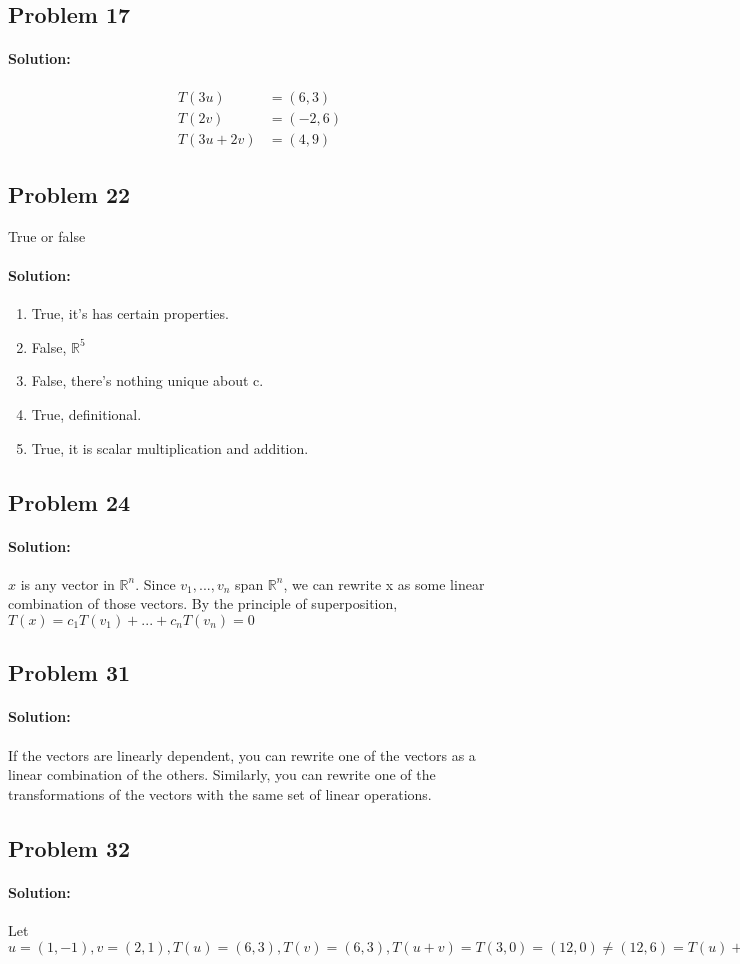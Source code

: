 \documentclass[11pt, notitlepage]{article}
\newcommand{\R}{\mathbb{R}}
\newenvironment{solution}{\paragraph{Solution:}}{\hfill}
\begin{document}
\subsection{Problem 17}
\begin{solution}
	\begin{align*}
		T(3u)&=(6, 3) \\
		T(2v)&=(-2, 6) \\
		T(3u+2v)&=(4,9)
	\end{align*}
\end{solution}
\subsection{Problem 22}
True or false
\begin{solution}
	\begin{enumerate}[label=\alph*.)]
		\item True, it's has certain properties.
		\item False, $\R^5$
		\item False, there's nothing unique about c.
		\item True, definitional.
		\item True, it is scalar multiplication and addition.
	\end{enumerate}
\end{solution}
\subsection{Problem 24}
\begin{solution}
	$x$ is any vector in $\R^n$. Since $v_1,...,v_n$ span $\R^n$, we can rewrite x as some linear combination of those vectors. By the principle of superposition, $T(x)=c_1T(v_1)+...+c_nT(v_n)=0$
\end{solution}
\subsection{Problem 31}
\begin{solution}
	If the vectors are linearly dependent, you can rewrite one of the vectors as a linear combination of the others. Similarly, you can rewrite one of the transformations of the vectors with the same set of linear operations.
\end{solution}
\subsection{Problem 32}
\begin{solution}
	Let $u=(1,-1), v=(2,1), T(u)=(6,3), T(v)=(6,3), T(u+v)=T(3,0)=(12,0) \neq (12,6)=T(u)+T(v)$
\end{solution}
\end{document}
